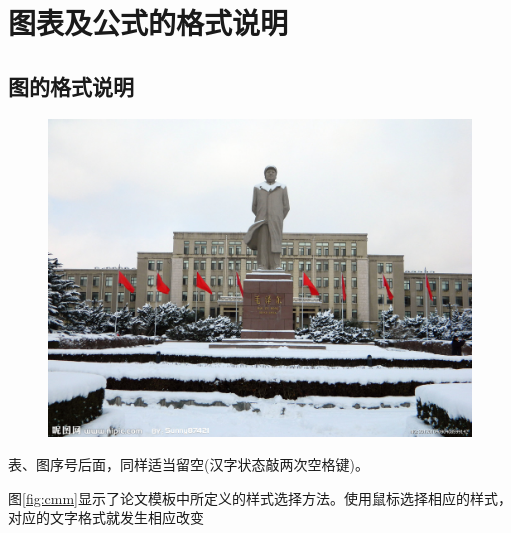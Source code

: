 \chapter{图表及公式的格式说明}
%
\label{cha:figure_and_table}



\section{图的格式说明}
%
\label{sec:format_of_figure}

\begin{figure}[htpb]
    \centering
    \includegraphics[width=0.8\linewidth]{figures/cmm.jpg}
\end{figure}
表、图序号后面，同样适当留空(汉字状态敲两次空格键)。

图\ref{fig:cmm}显示了论文模板中所定义的样式选择方法。使用鼠标选择相应的样式，对应的文字格式就发生相应改变

